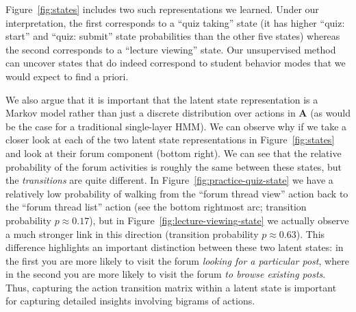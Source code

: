 Figure~\ref{fig:states} includes two such representations we learned. Under
our interpretation, the first corresponds to a ``quiz taking'' state (it
has higher ``quiz: start'' and ``quiz: submit'' state probabilities than
the other five states) whereas the second corresponds to a ``lecture
viewing'' state. Our unsupervised method can uncover states that do indeed
correspond to student behavior modes that we would expect to find a priori.

We also argue that it is important that the latent state representation is
a Markov model rather than just a discrete distribution over actions in
$\mathbf{A}$ (as would be the case for a traditional single-layer HMM). We
can observe why if we take a closer look at each of the two latent state
representations in Figure~\ref{fig:states} and look at their forum
component (bottom right). We can see that the relative probability of the
forum activities is roughly the same between these states, but the
\emph{transitions} are quite different. In
Figure~\ref{fig:practice-quiz-state} we have a relatively low probability
of walking from the ``forum thread view'' action back to the ``forum thread
list'' action (see the bottom rightmost arc; transition probability $p
\approx 0.17$), but in Figure~\ref{fig:lecture-viewing-state} we actually
observe a much stronger link in this direction (transition probability $p
\approx 0.63$). This difference highlights an important distinction between
these two latent states: in the first you are more likely to visit the
forum \emph{looking for a particular post}, where in the second you are
more likely to visit the forum \emph{to browse existing posts}. Thus,
capturing the action transition matrix within a latent state is important
for capturing detailed insights involving bigrams of actions.

